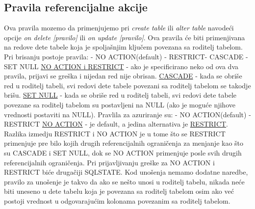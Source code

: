 \documentclass{article}
\begin{document}
\subsection{Pravila referencijalne akcije}
Ova pravila mozemo da primenjujemo pri\textit{ create table} ili
\textit{alter table} navodeći opcije \textit{on delete [pravilo]} ili
\textit{on update [pravilo]}. Ova pravila će biti primenjivana na
redove dete tabele koja je spoljašnjim ključem povezana sa roditelj
tabelom. \newline
Pri brisanju postoje pravila:
\newline \hspace*{0.2cm}- NO ACTION(default)
\newline \hspace*{0.2cm}- RESTRICT- CASCADE
\newline \hspace*{0.2cm}- SET NULL
\newline \underline{NO ACTION i RESTRICT} - ako je specificirano neko
od ova dva pravila, prijavi se greška i nijedan red nije obrisan.
\newline \underline{CASCADE} - kada se obriše red u roditelj tabeli,
svi redovi dete tabele povezani sa roditelj tabelom se takodje brišu.
\newline \underline{SET NULL}  - kada se obriše red u roditelj tabeli,
svi redovi dete tabele povezane sa roditelj tabelom su postavljeni na
NULL (ako je moguće njihove vrednosti postaviti na NULL).
\newline
Pravlila za azuriranje su:
\newline \hspace*{0.2cm}- NO ACTION(default)
\newline \hspace*{0.2cm}- RESTRICT
\newline \underline{NO ACTION} - je default, a jedina alternativa je
\underline{RESTRICT}. Razlika izmedju RESTRICT i NO ACTION je u tome
što se RESTRICT primenjuje pre bilo kojih drugih referencijalnih
ograničenja za menjanje kao što su CASCADE i SET NULL, dok se NO ACTION
primenjuje posle svih drugih referencijalnih ograničenja. Pri
prijavljivanju greške za NO ACTION i RESTRICT biće drugačiji SQLSTATE.
\newline
Kod unošenja nemamo dodatne naredbe, pravilo za unošenje je takvo da
ako se nešto unosi u roditelj tabelu, nikada neće biti uneseno u dete
tabelu koja je povezana sa roditelj tabelom osim ako već postoji
vrednost u odgovarajućim kolonama povezanim sa roditelj tabelom.
\end{document}
